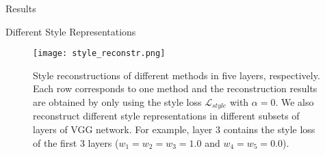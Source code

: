 \documentclass{article}
\begin{document}
\begin{section}{Results}
\begin{subsection}{Different Style Representations}


\begin{figure}[htpb]
\begin{center}
	\texttt{[image: style\_reconstr.png]}
\end{center}
\vspace{-2mm}
	\caption{Style reconstructions of different methods in five layers, respectively. Each row corresponds to one method and the reconstruction results are obtained by only using the style loss $\mathcal{L}_{style}$ with $\alpha=0$. We also reconstruct different style representations in different subsets of layers of VGG network. For example, layer 3 contains the style loss of the first 3 layers ($w_1=w_2=w_3=1.0$ and $w_4=w_5=0.0$).%
	} \label{fig:style_reconstr}
\vspace{-2mm}
\end{figure}





\end{subsection}
\end{section}
\end{document}
